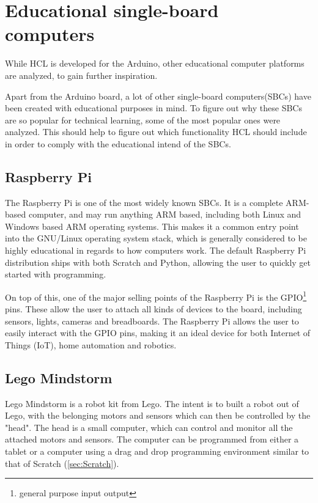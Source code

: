 \section{Educational single-board computers}
While HCL is developed for the Arduino, other educational computer platforms are analyzed, to gain further inspiration.

Apart from the Arduino board, a lot of other single-board computers(SBCs) have been created with educational purposes in mind.
To figure out why these SBCs are so popular for technical learning, some of the most popular ones were analyzed.
This should help to figure out which functionality HCL should include in order to comply with the educational intend of the SBCs\cite{SBC}.

\subsection{Raspberry Pi}
The Raspberry Pi is one of the most widely known SBCs. 
It is a complete ARM-based computer, and may run anything ARM based, including both Linux and Windows based ARM operating systems. 
This makes it a common entry point into the GNU/Linux operating system stack, which is generally considered to be highly educational in regards to how computers work.
The default Raspberry Pi distribution ships with both Scratch and Python, allowing the user to quickly get started with programming\cite{RaspberryPi}.

On top of this, one of the major selling points of the Raspberry Pi is the GPIO\footnote{general purpose input output} pins. 
These allow the user to attach all kinds of devices to the board, including sensors, lights, cameras and breadboards. 
The Raspberry Pi allows the user to easily interact with the GPIO pins, making it an ideal device for both Internet of Things (IoT), home automation and robotics\cite{RaspberryPi}.

\subsection{Lego Mindstorm}
Lego Mindstorm is a robot kit from Lego. 
The intent is to built a robot out of Lego, with the belonging motors and sensors which can then be controlled by the "head". 
The head is a small computer, which can control and monitor all the attached motors and sensors. 
The computer can be programmed from either a tablet or a computer using a drag and drop programming environment similar to that of Scratch (\ref{sec:Scratch})\cite{LegoMindstorms}.

